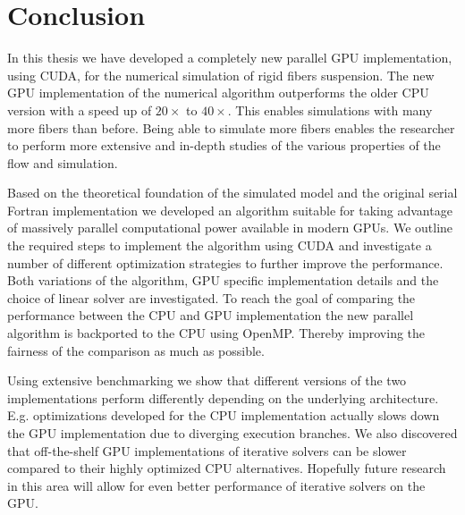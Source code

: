 \chapter{Conclusion}

In this thesis we have developed a completely new parallel GPU implementation, using CUDA, for the numerical simulation of rigid fibers suspension. The new GPU implementation of the numerical algorithm outperforms the older CPU version with a speed up of $20×$ to $40×$. This enables simulations with many more fibers than before. Being able to simulate more fibers enables the researcher to perform more extensive and in-depth studies of the various properties of the flow and simulation.

Based on the theoretical foundation of the simulated model and the original serial Fortran implementation we developed an algorithm suitable for taking advantage of massively parallel computational power available in modern GPUs. We outline the required steps to implement the algorithm using CUDA and investigate a number of different optimization strategies to further improve the performance. Both variations of the algorithm, GPU specific implementation details and the choice of linear solver are investigated. To reach the goal of comparing the performance between the CPU and GPU implementation the new parallel algorithm is backported to the CPU using OpenMP. Thereby improving the fairness of the comparison as much as possible.

Using extensive benchmarking we show that different versions of the two implementations perform differently depending on the underlying architecture. E.g. optimizations developed for the CPU implementation actually slows down the GPU implementation due to diverging execution branches. We also discovered that off-the-shelf GPU implementations of iterative solvers can be slower compared to their highly optimized CPU alternatives. Hopefully future research in this area will allow for even better performance of iterative solvers on the GPU.

